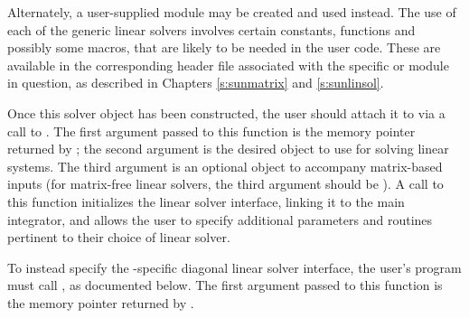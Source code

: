 Alternately, a user-supplied
 module may be created and used instead.  The use
of each of the generic linear solvers involves certain constants,
functions and possibly some macros, that are likely to be needed in
the user code.  These are available in the corresponding header file
associated with the specific {\sunmatrix} or {\sunlinsol} module in
question, as described in Chapters \ref{s:sunmatrix} and
\ref{s:sunlinsol}.

Once this solver object has been constructed, the user should attach
it to {\cvode} via a call to .  The first
argument passed to this function is the {\cvode} memory pointer
returned by ; the second argument is the desired
{\sunlinsol} object to use for solving linear systems.  The third
argument is an optional {\sunmatrix} object to accompany matrix-based
{\sunlinsol} inputs (for matrix-free linear solvers, the third
argument should be ).  A call to this function initializes
the {\cvls} linear solver interface, linking it to the main {\cvode}
integrator, and allows the user to specify additional parameters and
routines pertinent to their choice of linear solver.

To instead specify the {\cvode}-specific diagonal linear solver
interface, the user's program must call , as documented
below.  The first argument passed to this function is the {\cvode}
memory pointer returned by .

